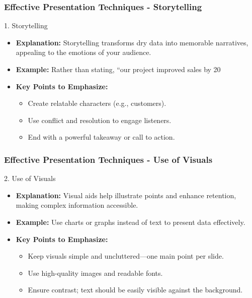 \documentclass[aspectratio=169]{beamer}
\begin{document}
\begin{frame}[fragile]
    \frametitle{Effective Presentation Techniques - Storytelling}
    \begin{block}{1. Storytelling}
        \begin{itemize}
            \item \textbf{Explanation:} Storytelling transforms dry data into memorable narratives, appealing to the emotions of your audience.
            \item \textbf{Example:} Rather than stating, “our project improved sales by 20%
            \item \textbf{Key Points to Emphasize:}
            \begin{itemize}
                \item Create relatable characters (e.g., customers).
                \item Use conflict and resolution to engage listeners.
                \item End with a powerful takeaway or call to action.
            \end{itemize}
        \end{itemize}
    \end{block}
\end{frame}

\begin{frame}[fragile]
    \frametitle{Effective Presentation Techniques - Use of Visuals}
    \begin{block}{2. Use of Visuals}
        \begin{itemize}
            \item \textbf{Explanation:} Visual aids help illustrate points and enhance retention, making complex information accessible.
            \item \textbf{Example:} Use charts or graphs instead of text to present data effectively.
            \item \textbf{Key Points to Emphasize:}
            \begin{itemize}
                \item Keep visuals simple and uncluttered—one main point per slide.
                \item Use high-quality images and readable fonts.
                \item Ensure contrast; text should be easily visible against the background.
            \end{itemize}
        \end{itemize}
    \end{block}
\end{frame}
\end{document}
